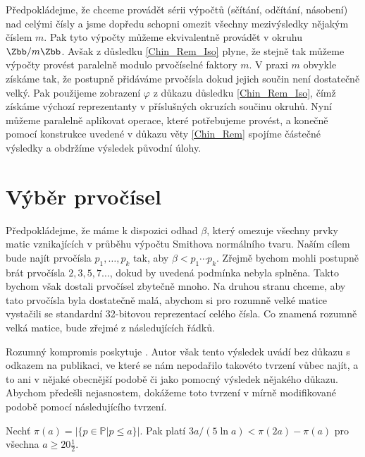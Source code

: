 Předpokládejme, že chceme provádět sérii výpočtů (sčítání, odčítání,
násobení) nad celými čísly a jsme dopředu schopni omezit všechny mezivýsledky nějakým číslem
$ m $. Pak tyto výpočty můžeme ekvivalentně provádět v okruhu $ \Zbb / m \Zbb $.
Avšak z důsledku \ref{Chin_Rem_Iso} plyne, že stejně tak můžeme výpočty provést
paralelně modulo prvočíselné faktory $ m $. V praxi $ m $ obvykle získáme tak,
že postupně přidáváme prvočísla dokud jejich součin není dostatečně velký.
Pak použijeme zobrazení $ \varphi $ z důkazu důsledku \ref{Chin_Rem_Iso},
čímž získáme výchozí reprezentanty v příslušných okruzích součinu okruhů.
Nyní můžeme paralelně aplikovat operace, které potřebujeme provést, a konečně
pomocí konstrukce uvedené v důkazu věty \ref{Chin_Rem} spojíme částečné výsledky
a obdržíme výsledek původní úlohy.


\section{Výběr prvočísel}
Předpokládejme, že máme k dispozici odhad $ \beta $, který omezuje všechny
prvky matic vznikajících v průběhu výpočtu Smithova normálního tvaru. Naším cílem bude
najít prvočísla $ p_1,\dots, p_k $ tak, aby $ \beta < p_1 \cdots p_k $. Zřejmě
bychom mohli postupně brát prvočísla $ 2, 3, 5, 7 \dots $, dokud by uvedená
podmínka nebyla splněna. Takto bychom však dostali prvočísel zbytečně mnoho. Na
druhou stranu chceme, aby tato prvočísla byla dostatečně malá, abychom
si pro rozumně velké matice vystačili se standardní 32-bitovou reprezentací
celého čísla. Co znamená rozumně velká matice, bude zřejmé z následujících řádků.

Rozumný kompromis poskytuje \cite[Lemma 14]{triang}. Autor však tento výsledek
uvádí bez důkazu s odkazem na publikaci, ve které se nám nepodařilo takovéto
tvrzení vůbec najít, a to ani v nějaké obecnější podobě či jako pomocný výsledek
nějakého důkazu. Abychom předešli nejasnostem, dokážeme toto tvrzení v mírně
modifikované podobě pomocí následujícího tvrzení.


\begin{lem} \label{num_primes_src}
Nechť $ \pi(a) = \left\vert \{ p \in \mathbb{P} \vert p \leq a \} \right\vert $. Pak
platí $ 3a / (5 \ln{a}) < \pi(2a) - \pi(a) $ pro všechna $ a \geq 20 \frac{1}{2} $.
\end{lem}

